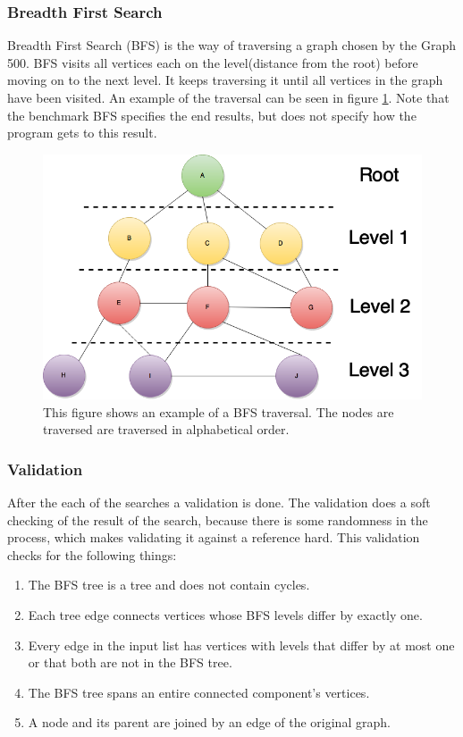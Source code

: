 \subsubsection{Breadth First Search}
Breadth First Search\cite{bfs} (BFS) is the way of traversing a graph chosen by the Graph 500. BFS visits all vertices each on the level(distance from the root) before moving on to the next level. It keeps traversing it until all vertices in the graph have been visited. An example of the traversal can be seen in figure \ref{fig:bfs}. 
Note that the benchmark  BFS  specifies the end results, but does not specify how the program gets to this result.
\begin{figure}[!h]
	\includegraphics[width=\textwidth]{images/BFS-example1-with-levels}
	\caption{This figure shows an example of a BFS traversal. The nodes are traversed are traversed in alphabetical order.}
	\label{fig:bfs}
\end{figure}

\subsubsection{Validation}
After the each of the searches a validation is done. The validation does a soft checking of the result of the search, because there is some randomness in the process, which makes validating it against a reference hard. This validation checks for the following things:
\begin{enumerate}
\item The BFS tree is a tree and does not contain cycles.
\item Each tree edge connects vertices whose BFS levels differ by exactly one.
\item Every edge in the input list has vertices with levels that differ by at most one or that both are not in the BFS tree.
\item The BFS tree spans an entire connected component's vertices.
\item A node and its parent are joined by an edge of the original graph.
\end{enumerate}


